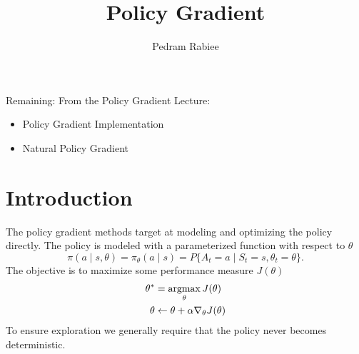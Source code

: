 \documentclass{article}
\title{Policy Gradient}
\author{Pedram Rabiee}
\begin{document}
\begin{titlepage}
\thispagestyle{empty}
\maketitle

\tableofcontents


Remaining:
From the Policy Gradient Lecture:
\begin{itemize}
    \item Policy Gradient Implementation
    \item Natural Policy Gradient
\end{itemize}
\end{titlepage}



\section{Introduction}
The policy gradient methods target at modeling and optimizing the policy directly. The policy is modeled with a parameterized function with respect to $\theta$
\begin{equation*}
    \pi(a \mid s,\theta) = \pi_\theta(a \mid s) = P\{A_t = a \mid S_t = s,\theta_t = \theta\}.
\end{equation*}
The objective is to maximize some performance measure $J(\theta)$
\begin{align*}
    \theta^* &= \operatorname*{argmax}_\theta J(\theta)\\
    \theta &\gets \theta + \alpha \nabla_\theta J(\theta)
\end{align*}
To ensure exploration we generally require that the policy never becomes deterministic.
\end{document}
